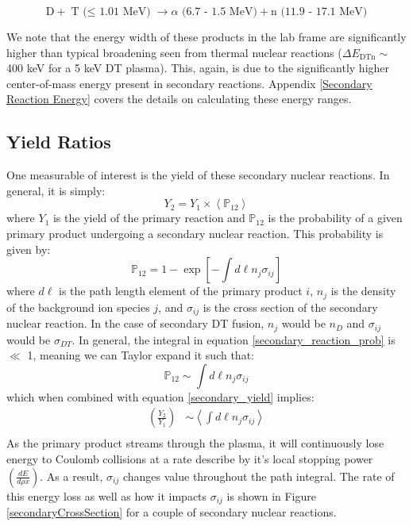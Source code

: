 	\begin{equation}
		\text{D} + \text{T ($\le$ 1.01 MeV)} \rightarrow \alpha \text{ (6.7 - 1.5 MeV)} + \text{n (11.9 - 17.1 MeV)}
		\label{secondaryDTn}
	\end{equation}

	We note that the energy width of these products in the lab frame are significantly higher than typical broadening seen from thermal nuclear reactions ($\Delta E_{\text{DTn}}\sim$ 400 keV for a 5 keV DT plasma). This, again, is due to the significantly higher center-of-mass energy present in secondary reactions.	Appendix \ref{Secondary Reaction Energy} covers the details on calculating these energy ranges.
	
	
\subsection{Yield Ratios}

	One measurable of interest is the yield of these secondary nuclear reactions. In general, it is simply:
	\begin{equation}
		Y_2 = Y_1 \times \left<\mathbb{P}_{12}\right>
		\label{secondary_yield}
	\end{equation}
	where $Y_1$ is the yield of the primary reaction and $\mathbb{P}_{12}$ is the probability of a given primary product undergoing a secondary nuclear reaction. This probability is given by:
	\begin{equation}
		\mathbb{P}_{12} = 1 - \exp\left[- \int d\ell n_{j} \sigma_{ij} \right]
		\label{secondary_reaction_prob}
	\end{equation}
	where $d\ell$ is the path length element of the primary product $i$, $n_j$ is the density of the background ion species $j$, and $\sigma_{ij}$ is the cross section of the secondary nuclear reaction. In the case of secondary DT fusion, $n_j$ would be $n_D$ and $\sigma_{ij}$ would be $\sigma_{DT}$. In general, the integral in equation \ref{secondary_reaction_prob} is $\ll$ 1, meaning we can Taylor expand it such that:
	\begin{equation}
		\mathbb{P}_{12} \sim \int d\ell n_{j} \sigma_{ij}
		\label{secondary_reaction_prob_approx}
	\end{equation}
	which when combined with equation \ref{secondary_yield} implies:
	\begin{equation}
		\begin{split}
			\left(\frac{Y_2}{Y_1}\right) 
			& \sim \left<\int d\ell n_{j} \sigma_{ij}\right> \\
		\end{split}
	\end{equation}
	As the primary product streams through the plasma, it will continuously lose energy to Coulomb collisions at a rate describe by it's local stopping power $\left(\frac{dE}{d\rho x}\right)$. As a result, $\sigma_{ij}$ changes value throughout the path integral. The rate of this energy loss as well as how it impacts $\sigma_{ij}$ is shown in Figure \ref{secondaryCrossSection} for a couple of secondary nuclear reactions.
	
